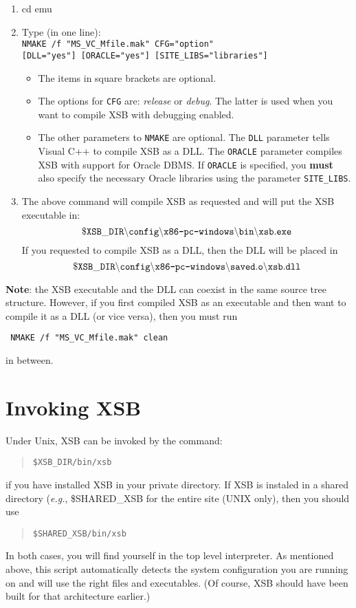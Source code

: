 \begin{enumerate}

\item
   cd emu

\item
  Type (in one line):\\
  {\tt NMAKE /f "MS\_VC\_Mfile.mak" CFG="option" \\
    \hspace*{2cm}[DLL="yes"] [ORACLE="yes"] [SITE\_LIBS="libraries"]}
  \begin{itemize}
  \item The items in square brackets are optional.
  \item The options for {\tt CFG} are: \emph{release} or \emph{debug}.  The
    latter is used when you want to compile XSB with debugging enabled.
  \item The other parameters to {\tt NMAKE} are optional. The {\tt DLL}
    parameter tells Visual C++ to compile XSB as a DLL. The {\tt ORACLE}
    parameter compiles XSB with support for Oracle DBMS. If {\tt ORACLE} is
    specified, you {\bf must} also specify the necessary Oracle libraries
    using the parameter {\tt SITE\_LIBS}.
  \end{itemize}
   
 \item The above command will compile XSB as requested and will put the XSB 
   executable in:
\[
 \tt
 \$XSB\_DIR\backslash config\backslash \mbox{\tt x86-pc-windows}\backslash bin
 \backslash xsb.exe
\]
   If you requested to compile XSB as a DLL, then the DLL will be placed in
\[
 \tt
 \$XSB\_DIR\backslash config\backslash \mbox{\tt x86-pc-windows}\backslash
 saved.o \backslash xsb.dll
\]
\end{enumerate}
{\bf Note}: the XSB executable and the DLL can coexist in the same source
tree structure. However, if you first compiled  XSB as an executable and
then want to compile it as a DLL (or vice versa), then you must run 
\begin{verbatim}
 NMAKE /f "MS_VC_Mfile.mak" clean  
\end{verbatim}
in between.


\section{Invoking XSB}

Under Unix, XSB can be invoked by the command:
\begin{quote}
       \tt \$XSB\_DIR/bin/xsb
\end{quote}
if you have installed XSB in your private directory.
If XSB is instaled in a shared directory ({\it e.g.}, \$SHARED\_XSB
for the entire site (UNIX only), then you should use
\begin{quote}
       \tt \$SHARED\_XSB/bin/xsb
\end{quote}
In both cases, you will find yourself in the top level interpreter.  
As mentioned above, this script automatically detects the system
configuration you are running on and will use the right files and
executables. (Of course, XSB should have been built for that architecture
earlier.)


